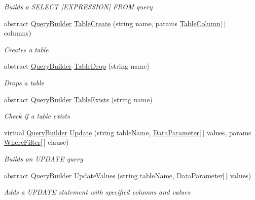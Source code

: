 \begin{DoxyCompactItemize}
\begin{DoxyCompactList}\small\item\em Builds a S\+E\+L\+E\+C\+T \mbox{[}E\+X\+P\+R\+E\+S\+S\+I\+O\+N\mbox{]} F\+R\+O\+M query \end{DoxyCompactList}\item 
abstract \hyperlink{classOTA_1_1Data_1_1QueryBuilder}{Query\+Builder} \hyperlink{classOTA_1_1Data_1_1QueryBuilder_a931e295e162c17ec276b49670866cda7}{Table\+Create} (string name, params \hyperlink{structOTA_1_1Data_1_1TableColumn}{Table\+Column}\mbox{[}$\,$\mbox{]} columns)
\begin{DoxyCompactList}\small\item\em Creates a table \end{DoxyCompactList}\item 
abstract \hyperlink{classOTA_1_1Data_1_1QueryBuilder}{Query\+Builder} \hyperlink{classOTA_1_1Data_1_1QueryBuilder_ab285df1a750d804cd8bb25bfd43ceaf2}{Table\+Drop} (string name)
\begin{DoxyCompactList}\small\item\em Drops a table \end{DoxyCompactList}\item 
abstract \hyperlink{classOTA_1_1Data_1_1QueryBuilder}{Query\+Builder} \hyperlink{classOTA_1_1Data_1_1QueryBuilder_ad34634a54dd4144ddaca6fb14b4f69da}{Table\+Exists} (string name)
\begin{DoxyCompactList}\small\item\em Check if a table exists \end{DoxyCompactList}\item 
virtual \hyperlink{classOTA_1_1Data_1_1QueryBuilder}{Query\+Builder} \hyperlink{classOTA_1_1Data_1_1QueryBuilder_a555ab46e312bac8d5fe07e2e89589898}{Update} (string table\+Name, \hyperlink{structOTA_1_1Data_1_1DataParameter}{Data\+Parameter}\mbox{[}$\,$\mbox{]} values, params \hyperlink{structOTA_1_1Data_1_1WhereFilter}{Where\+Filter}\mbox{[}$\,$\mbox{]} clause)
\begin{DoxyCompactList}\small\item\em Builds an U\+P\+D\+A\+T\+E query \end{DoxyCompactList}\item 
abstract \hyperlink{classOTA_1_1Data_1_1QueryBuilder}{Query\+Builder} \hyperlink{classOTA_1_1Data_1_1QueryBuilder_ad1e7c89323ba5635470ee438aa08433d}{Update\+Values} (string table\+Name, \hyperlink{structOTA_1_1Data_1_1DataParameter}{Data\+Parameter}\mbox{[}$\,$\mbox{]} values)
\begin{DoxyCompactList}\small\item\em Adds a U\+P\+D\+A\+T\+E statement with specified columns and values \end{DoxyCompactList}\item 

\end{DoxyCompactItemize}
